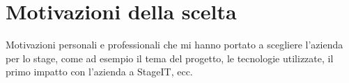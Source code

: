 \section{Motivazioni della scelta}
\label{sez:motivazioni-scelta}

Motivazioni personali e professionali che mi hanno portato a scegliere l'azienda per lo stage, come ad esempio il tema del progetto, le tecnologie utilizzate, 
il primo impatto con l'azienda a StageIT, ecc.\\

